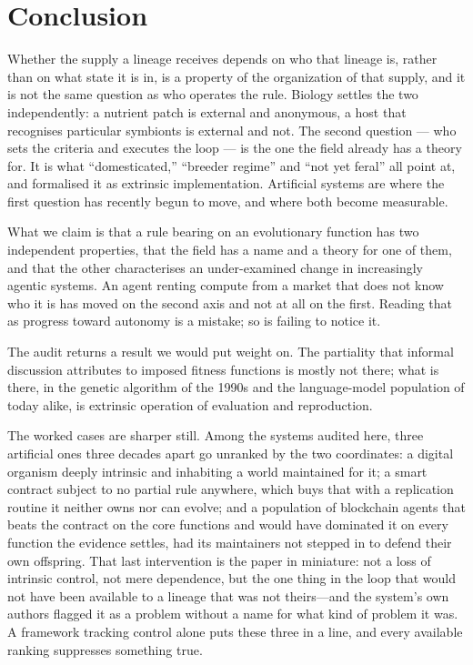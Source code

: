 \documentclass[review,3p,times]{elsarticle}
\begin{document}
\section{Conclusion}

Whether the supply a lineage receives depends on who that lineage is, rather
than on what state it is in, is a property of the organization of that supply,
and it is not the same question as who operates the rule. Biology settles the
two independently: a nutrient patch is external and anonymous, a host that
recognises particular symbionts is external and not. The second question --- who
sets the criteria and executes the loop --- is the one the field already has a
theory for. It is what ``domesticated,'' ``breeder regime'' and ``not yet
feral'' all point at, and \citet{taylor2019} formalised it as extrinsic
implementation. Artificial systems are where the first question has recently
begun to move, and where both become measurable.

What we claim is that a rule bearing on an evolutionary function has two
independent properties, that the field has a name and a theory for one of them,
and that the other characterises an under-examined change in increasingly
agentic systems. An agent renting compute from a market that does not know who
it is has moved on the second axis and not at all on the first. Reading that as
progress toward autonomy is a mistake; so is failing to notice it.

The audit returns a result we would put weight on. The partiality that
informal discussion attributes to imposed fitness functions is mostly not
there; what is there, in the genetic algorithm of the 1990s and the language-model
population of today alike, is extrinsic operation of evaluation and
reproduction.

The worked cases are sharper still. Among the systems audited here, three
artificial ones three decades apart go unranked by the two coordinates: a
digital organism
deeply intrinsic and inhabiting a world maintained for it; a smart contract
subject to no partial rule anywhere, which buys that with a replication
routine it neither owns nor can evolve; and a population of blockchain agents
that beats the contract on the core functions and would have dominated it on
every function the evidence settles, had its maintainers not stepped in to
defend their own offspring. That last
intervention is the paper in miniature: not a loss of intrinsic control, not
mere dependence, but the one thing in the loop that would not have been
available to a lineage that was not theirs---and the system's own authors
flagged it as a problem without a name for what kind of problem it was. A
framework tracking control alone puts these three in a line, and every
available ranking suppresses something true.
\end{document}

